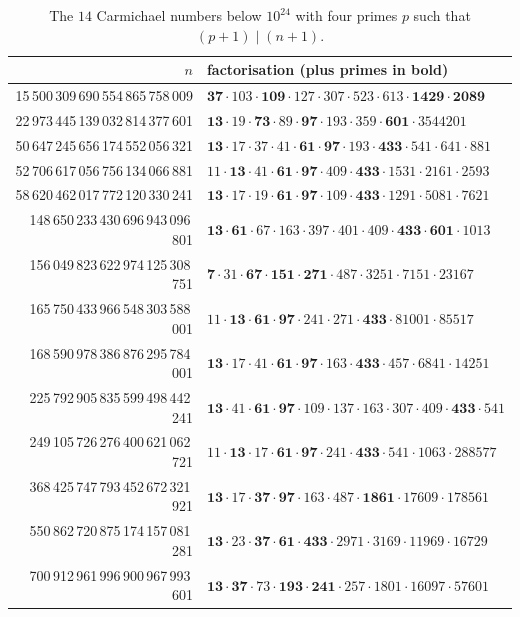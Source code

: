 \documentclass[11pt]{amsart}
\theoremstyle{definition}
\theoremstyle{remark}
\begin{document}
\begin{table}[h]
\centering\footnotesize
\begin{tabular}{rl}
\toprule
$n$ & factorisation (plus primes in bold)\\
\midrule
15\,500\,309\,690\,554\,865\,758\,009 & $\mathbf{37}\cdot103\cdot\mathbf{109}\cdot127\cdot307\cdot523\cdot613\cdot\mathbf{1429}\cdot\mathbf{2089}$\\
22\,973\,445\,139\,032\,814\,377\,601 & $\mathbf{13}\cdot19\cdot\mathbf{73}\cdot89\cdot\mathbf{97}\cdot193\cdot359\cdot\mathbf{601}\cdot3544201$\\
50\,647\,245\,656\,174\,552\,056\,321 & $\mathbf{13}\cdot17\cdot37\cdot41\cdot\mathbf{61}\cdot\mathbf{97}\cdot193\cdot\mathbf{433}\cdot541\cdot641\cdot881$\\
52\,706\,617\,056\,756\,134\,066\,881 & $11\cdot\mathbf{13}\cdot41\cdot\mathbf{61}\cdot\mathbf{97}\cdot409\cdot\mathbf{433}\cdot1531\cdot2161\cdot2593$\\
58\,620\,462\,017\,772\,120\,330\,241 & $\mathbf{13}\cdot17\cdot19\cdot\mathbf{61}\cdot\mathbf{97}\cdot109\cdot\mathbf{433}\cdot1291\cdot5081\cdot7621$\\
148\,650\,233\,430\,696\,943\,096\,801 & $\mathbf{13}\cdot\mathbf{61}\cdot67\cdot163\cdot397\cdot401\cdot409\cdot\mathbf{433}\cdot\mathbf{601}\cdot1013$\\
156\,049\,823\,622\,974\,125\,308\,751 & $\mathbf{7}\cdot31\cdot\mathbf{67}\cdot\mathbf{151}\cdot\mathbf{271}\cdot487\cdot3251\cdot7151\cdot23167$\\
165\,750\,433\,966\,548\,303\,588\,001 & $11\cdot\mathbf{13}\cdot\mathbf{61}\cdot\mathbf{97}\cdot241\cdot271\cdot\mathbf{433}\cdot81001\cdot85517$\\
168\,590\,978\,386\,876\,295\,784\,001 & $\mathbf{13}\cdot17\cdot41\cdot\mathbf{61}\cdot\mathbf{97}\cdot163\cdot\mathbf{433}\cdot457\cdot6841\cdot14251$\\
225\,792\,905\,835\,599\,498\,442\,241 & $\mathbf{13}\cdot41\cdot\mathbf{61}\cdot\mathbf{97}\cdot109\cdot137\cdot163\cdot307\cdot409\cdot\mathbf{433}\cdot541$\\
249\,105\,726\,276\,400\,621\,062\,721 & $11\cdot\mathbf{13}\cdot17\cdot\mathbf{61}\cdot\mathbf{97}\cdot241\cdot\mathbf{433}\cdot541\cdot1063\cdot288577$\\
368\,425\,747\,793\,452\,672\,321\,921 & $\mathbf{13}\cdot17\cdot\mathbf{37}\cdot\mathbf{97}\cdot163\cdot487\cdot\mathbf{1861}\cdot17609\cdot178561$\\
550\,862\,720\,875\,174\,157\,081\,281 & $\mathbf{13}\cdot23\cdot\mathbf{37}\cdot\mathbf{61}\cdot\mathbf{433}\cdot2971\cdot3169\cdot11969\cdot16729$\\
700\,912\,961\,996\,900\,967\,993\,601 & $\mathbf{13}\cdot\mathbf{37}\cdot73\cdot\mathbf{193}\cdot\mathbf{241}\cdot257\cdot1801\cdot16097\cdot57601$\\
\bottomrule
\end{tabular}
\caption{The $14$ Carmichael numbers below $10^{24}$ with four primes $p$ such that $(p+1)\mid(n+1)$.}\label{tab:four}
\end{table}
\end{document}
